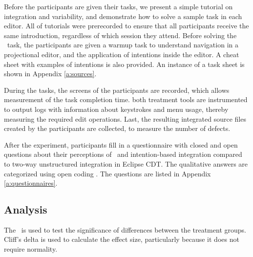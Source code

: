 Before the participants are given their tasks, we present a simple tutorial on integration and variability, and demonstrate how to solve a sample task in each editor. All of tutorials were prerecorded to ensure that all participants receive the same introduction, regardless of which session they attend. Before solving the \tooln~task, the participants are given a warmup task to understand navigation in a projectional editor, and the application of intentions inside the editor. A cheat sheet with examples of intentions is also provided. An instance of a task sheet is shown in Appendix \ref{a:sources}.

During the tasks, the screens of the participants are recorded, which allows measurement of the task completion time.  both treatment tools are instrumented to output logs with information about keystrokes and menu usage, thereby measuring the required edit operations. Last, the resulting integrated source files created by the participants are collected, to measure the number of defects.

After the experiment, participants fill in a questionnaire with closed and open questions about their perceptions of \tooln~and intention-based integration compared to two-way unstructured integration in Eclipse CDT. The qualitative answers are categorized using open coding \cite{strauss}. The questions are listed in Appendix \ref{a:questionnaires}.

\subsection{Analysis}
The \anova~is used to test the significance of differences between the treatment groups. Cliff's delta is used to calculate the effect size, particularly because it does not require normality.
